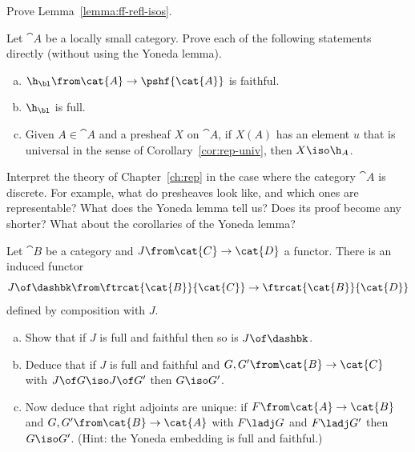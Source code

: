 \exs


\begin{question}        
\label{ex:ff-refl-isos}
Prove Lemma~\ref{lemma:ff-refl-isos}.
\end{question}


\begin{question}
Let $\cat{A}$ be a locally small category.  Prove each of the following
statements directly (without using the Yoneda lemma).
% 
\begin{enumerate}[(b)]
\item 
$\h_\bl\from \cat{A} \to \pshf{\cat{A}}$ is faithful.

\item 
$\h_\bl$ is full.

\item
Given $A \in \cat{A}$ and a presheaf $X$ on $\cat{A}$, if $X(A)$ has an
element $u$ that is universal in the sense of Corollary~\ref{cor:rep-univ},
then $X \iso \h_A$.
\end{enumerate}
\end{question}


\begin{question}
Interpret the theory of Chapter~\ref{ch:rep} in the case where the category
$\cat{A}$ is discrete.  For example, what do presheaves look like, and
which ones are representable?  What does the Yoneda lemma tell us?  Does
its proof become any shorter?  What about the corollaries of the Yoneda
lemma?
\end{question}


\begin{question}        
\label{ex:adjts-unique}
Let $\cat{B}$ be a category and $J\from \cat{C} \to \cat{D}$ a functor.
There is an induced functor
\[
J \of \dashbk\from \ftrcat{\cat{B}}{\cat{C}} \to \ftrcat{\cat{B}}{\cat{D}}
\]
defined by composition with $J$.  
% 
\begin{enumerate}[(b)]
\item 
Show that if $J$ is full and faithful then so is $J\of\dashbk$.

\item 
Deduce that if $J$ is full and faithful and $G, G'\from \cat{B} \to
\cat{C}$ with $J \of G \iso J \of G'$ then $G \iso G'$.

\item 
Now deduce that right adjoints are unique:%
%
%
if $F\from \cat{A} \to \cat{B}$ and $G, G'\from \cat{B} \to \cat{A}$ with
$F \ladj G$ and $F \ladj G'$ then $G \iso G'$.  (Hint: the Yoneda embedding
is full and faithful.)
\end{enumerate}
\end{question}



